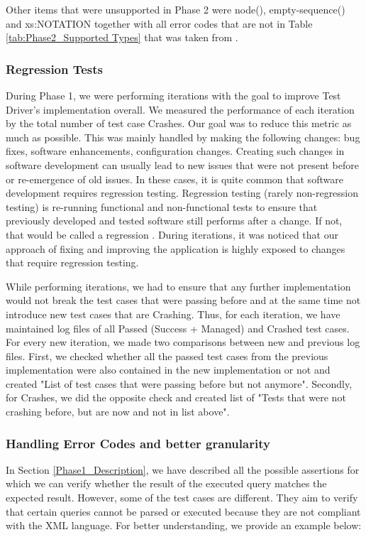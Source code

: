 Other items that were unsupported in Phase 2 were node(), empty-sequence() and xs:NOTATION together with all error codes that are not in Table \ref{tab:Phase2_Supported Types} that was taken from \cite{RumbleSupportedErrorCodes}.

\subsubsection{Regression Tests}
During Phase 1, we were performing iterations with the goal to improve Test Driver's implementation overall. We measured the performance of each iteration by the total number of test case Crashes. Our goal was to reduce this metric as much as possible. This was mainly handled by making the following changes: bug fixes, software enhancements, configuration changes. Creating such changes in software development can usually lead to new issues that were not present before or re-emergence of old issues. In these cases, it is quite common that software development requires regression testing. Regression testing (rarely non-regression testing) is re-running functional and non-functional tests to ensure that previously developed and tested software still performs after a change. If not, that would be called a regression \cite{RegressionTesting}. During iterations, it was noticed that our approach of fixing and improving the application is highly exposed to changes that require regression testing. 

While performing iterations, we had to ensure that any further implementation would not break the test cases that were passing before and at the same time not introduce new test cases that are Crashing. Thus, for each iteration, we have maintained log files of all Passed (Success + Managed) and Crashed test cases. For every new iteration, we made two comparisons between new and previous log files. First, we checked whether all the passed test cases from the previous implementation were also contained in the new implementation or not and created "List of test cases that were passing before but not anymore". Secondly, for Crashes, we did the opposite check and created list of "Tests that were not crashing before, but are now and not in list above". 

\subsubsection{Handling Error Codes and better granularity}
\label{Phase2_ErrorCodes}
In Section \ref{Phase1_Description}, we have described all the possible assertions for which we can verify whether the result of the executed query matches the expected result. However, some of the test cases are different. They aim to verify that certain queries cannot be parsed or executed because they are not compliant with the XML language. For better understanding, we provide an example below:

